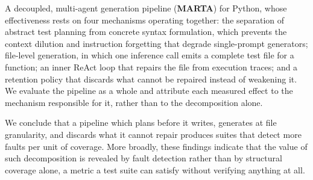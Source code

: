 \item A decoupled, multi-agent generation pipeline (\textbf{MARTA}) for Python, whose
effectiveness rests on four mechanisms operating together: the separation of abstract
test planning from concrete syntax formulation, which prevents the context dilution
and instruction forgetting that degrade single-prompt generators; file-level
generation, in which one inference call emits a complete test file for a function;
an inner ReAct loop that repairs the file from execution traces; and a retention
policy that discards what cannot be repaired instead of weakening it. We evaluate the
pipeline as a whole and attribute each measured effect to the mechanism responsible
for it, rather than to the decomposition alone.


We conclude that a pipeline which plans before it writes, generates at file
granularity, and discards what it cannot repair produces suites that detect more
faults per unit of coverage. More broadly, these findings indicate that the value of
such decomposition is revealed by fault detection rather than by structural coverage
alone, a metric a test suite can satisfy without verifying anything at all.


